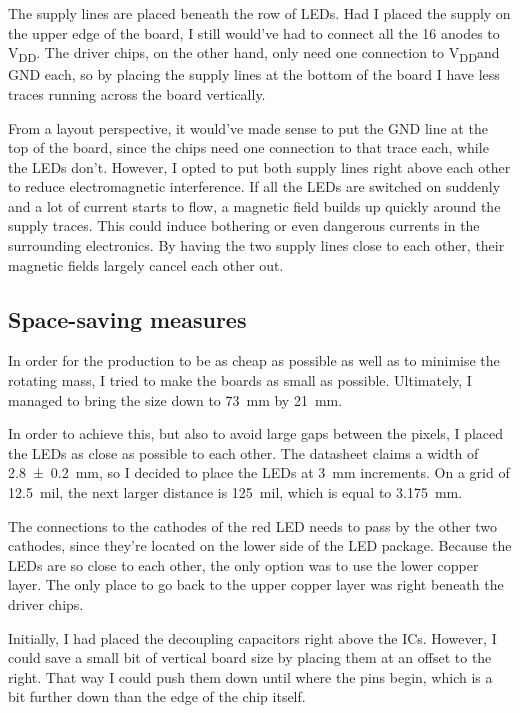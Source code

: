 \documentclass[a4paper, 11pt, titlepage]{report}
\def \vdd {V\textsubscript{DD}}
\begin{document}
The supply lines are placed beneath the row of LEDs. Had I placed the supply on the upper edge of
the board, I still would've had to connect all the 16 anodes to \vdd. The driver chips, on the
other hand, only need one connection to \vdd and GND each, so by placing the supply lines at the
bottom of the board I have less traces running across the board vertically.

From a layout perspective, it would've made sense to put the GND line at the top of the board,
since the chips need one connection to that trace each, while the LEDs don't. However, I opted to
put both supply lines right above each other to reduce electromagnetic interference. If all the
LEDs are switched on suddenly and a lot of current starts to flow, a magnetic field builds up
quickly around the supply traces. This could induce bothering or even dangerous currents in the
surrounding electronics. By having the two supply lines close to each other, their magnetic fields
largely cancel each other out.


\subsection{Space-saving measures}

In order for the production to be as cheap as possible as well as to minimise the rotating mass, I
tried to make the boards as small as possible. Ultimately, I managed to bring the size down to
\SI{73}{\milli\meter} by \SI{21}{\milli\meter}.

In order to achieve this, but also to avoid large gaps between the pixels, I placed the LEDs as
close as possible to each other. The datasheet claims a width of \SI{2.8 \pm 0.2}{\milli\meter},
so I decided to place the LEDs at \SI{3}{\milli\metre} increments. On a grid of \SI{12.5}{mil},
the next larger distance is \SI{125}{mil}, which is equal to \SI{3.175}{mm}.

The connections to the cathodes of the red LED needs to pass by the other two cathodes, since
they're located on the lower side of the LED package. Because the LEDs are so close to each other,
the only option was to use the lower copper layer. The only place to go back to the upper copper
layer was right beneath the driver chips.

Initially, I had placed the decoupling capacitors right above the ICs. However, I could save a
small bit of vertical board size by placing them at an offset to the right. That way I could push
them down until where the pins begin, which is a bit further down than the edge of the chip itself.
\end{document}
